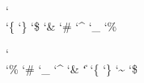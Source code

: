 

\ifdefined\nilcatcodes \else \newcatcodetable \nilcatcodes  \fi
\ifdefined\texcatcodes \else \newcatcodetable \texcatcodes  \fi
\ifdefined\luacatcodes \else \newcatcodetable \luacatcodes  \fi
\ifdefined\notcatcodes \else \newcatcodetable \notcatcodes  \fi
\ifdefined\vrbcatcodes \else \newcatcodetable \vrbcatcodes  \fi
\ifdefined\prtcatcodes \else \newcatcodetable \prtcatcodes  \fi

\startcatcodetable \nilcatcodes
    \catcode\tabasciicode      \spacecatcode
    \catcode\endoflineasciicode\endoflinecatcode
    \catcode\formfeedasciicode \endoflinecatcode
    \catcode\spaceasciicode    \spacecatcode
    \catcode\endoffileasciicode\ignorecatcode
\stopcatcodetable

\startcatcodetable \texcatcodes
    \catcode\tabasciicode      \spacecatcode
    \catcode\endoflineasciicode\endoflinecatcode
    \catcode\formfeedasciicode \endoflinecatcode
    \catcode\spaceasciicode    \spacecatcode
    \catcode\endoffileasciicode\ignorecatcode
    \catcode`\\                \escapecatcode
    \catcode`\{                \begingroupcatcode
    \catcode`\}                \endgroupcatcode
    \catcode`\$                \mathshiftcatcode
    \catcode`\&                \alignmentcatcode
    \catcode`\#                \parametercatcode
    \catcode`\^                \superscriptcatcode
    \catcode`\_                \subscriptcatcode
    \catcode`\%                \commentcatcode
\stopcatcodetable

\startcatcodetable \luacatcodes
    \catcode\tabasciicode      \othercatcode
    \catcode\endoflineasciicode\othercatcode
    \catcode\formfeedasciicode \othercatcode
    \catcode\spaceasciicode    \othercatcode
    \catcode\endoffileasciicode\ignorecatcode
    \catcode`\\                \escapecatcode
    \catcode`\%                \othercatcode
    \catcode`\#                \othercatcode
    \catcode`\_                \othercatcode
    \catcode`\^                \othercatcode
    \catcode`\&                \othercatcode
    \catcode`\|                \othercatcode
    \catcode`\{                \othercatcode
    \catcode`\}                \othercatcode
    \catcode`\~                \othercatcode
    \catcode`\$                \othercatcode
\stopcatcodetable

